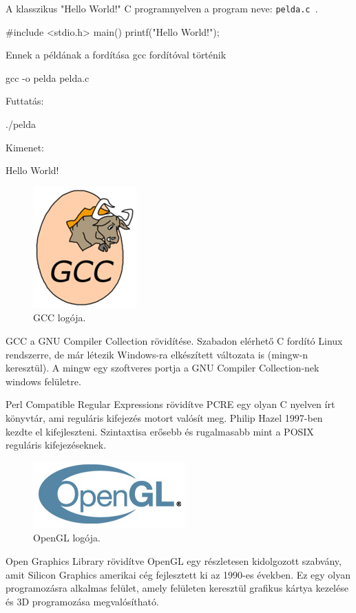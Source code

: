A klasszikus "Hello World!" C programnyelven a program neve: \texttt{pelda.c }.
\bigskip
\begin{cpp}
#include <stdio.h>
 main()
 {
 printf("Hello World!\n");
 } 
\end{cpp}
\bigskip
Ennek a példának a fordítása gcc fordítóval történik
\bigskip
\begin{cpp}
gcc -o pelda pelda.c
\end{cpp}
\bigskip
\bigskip
Futtatás:
\bigskip
\begin{cpp}
./pelda
\end{cpp}
\bigskip
Kimenet:
\bigskip
\begin{cpp}
Hello World!
\end{cpp}
\bigskip
{}
\bigskip
\begin{figure}[h]
\centering
\includegraphics[scale=0.6]{images/gcc.png}
\caption{GCC logója.}
\end{figure}
\bigskip
GCC a GNU Compiler Collection rövidítése. Szabadon elérhető C fordító Linux rendszerre, de már létezik Windows-ra elkészített változata is (mingw-n keresztül). A mingw egy szoftveres portja a GNU Compiler Collection-nek windows felületre.\cite{gnu2003richard}

\bigskip
Perl Compatible Regular Expressions rövidítve PCRE egy olyan C nyelven írt könyvtár, ami reguláris kifejezés motort valósít meg. Philip Hazel 1997-ben kezdte el kifejleszteni. Szintaxtisa erősebb és rugalmasabb mint a POSIX reguláris kifejezéseknek.\cite{philip1997pcre}
\bigskip
{}
\bigskip
\begin{figure}[h]
\centering
\includegraphics[scale=0.6]{images/opengl_logo.jpg}
\caption{OpenGL logója.}
\end{figure}
\bigskip
Open Graphics Library rövidítve OpenGL egy részletesen kidolgozott szabvány, amit  Silicon Graphics amerikai cég fejlesztett ki az 1990-es években. Ez egy olyan programozásra alkalmas felület, amely felületen keresztül grafikus kártya kezelése és 3D programozása megvalósítható.\cite{mason1999opengl}

